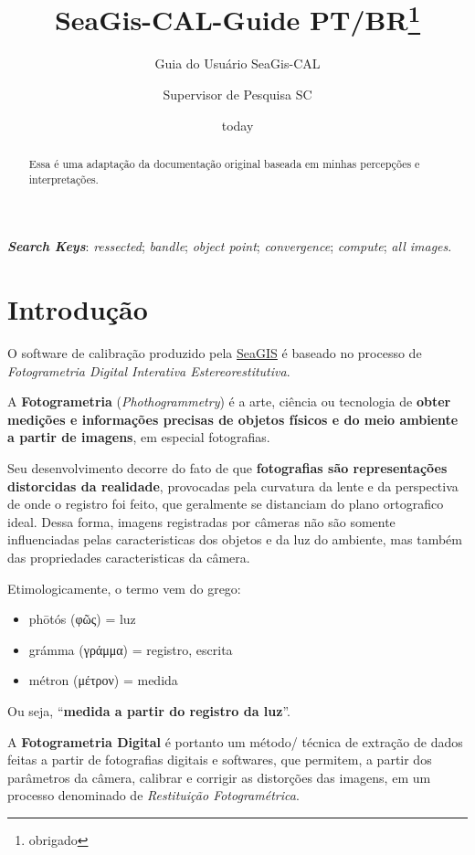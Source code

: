 \documentclass[
  12pt,
  letterpaper,
  DIV=11,
  numbers=noendperiod]{scrreprt}
\title{SeaGis-CAL-Guide PT/BR\thanks{obrigado}}
\subtitle{Guia do Usuário SeaGis-CAL}
\author{Supervisor de Pesquisa SC}
\date{today}
\renewcommand*\contentsname{Table of contents}
\newcommand\contentsname{Table of contents}
\begin{document}
\maketitle
\begin{abstract}
Essa é uma adaptação da documentação original baseada em minhas
percepções e interpretações.
\end{abstract}

\renewcommand*\contentsname{Sumário}
{
\hypersetup{linkcolor=}
\setcounter{tocdepth}{2}
\tableofcontents
}

\textbf{\emph{Search Keys}}: \emph{ressected}; \emph{bandle};
\emph{object point}; \emph{convergence}; \emph{compute}; \emph{all
images}.

\chapter{Introdução}\label{introduuxe7uxe3o}

O software de calibração produzido pela
\href{https://www.seagis.com.au/index.html\#about}{SeaGIS} é baseado no
processo de \emph{Fotogrametria Digital Interativa Estereorestitutiva}.

A \textbf{Fotogrametria} (\emph{Phothogrammetry}) é a arte, ciência ou
tecnologia de \textbf{obter medições e informações precisas de objetos
físicos e do meio ambiente a partir de imagens}, em especial
fotografias.

Seu desenvolvimento decorre do fato de que \textbf{fotografias são
representações distorcidas da realidade}, provocadas pela curvatura da
lente e da perspectiva de onde o registro foi feito, que geralmente se
distanciam do plano ortografico ideal. Dessa forma, imagens registradas
por câmeras não são somente influenciadas pelas caracteristicas dos
objetos e da luz do ambiente, mas também das propriedades
caracteristicas da câmera.

Etimologicamente, o termo vem do grego:

\begin{itemize}
\item
  phōtós (φῶς) = luz
\item
  grámma (γράμμα) = registro, escrita
\item
  métron (μέτρον) = medida
\end{itemize}

Ou seja, ``\textbf{medida a partir do registro da luz}''.

A \textbf{Fotogrametria Digital} é portanto um método/ técnica de
extração de dados feitas a partir de fotografias digitais e softwares,
que permitem, a partir dos parâmetros da câmera, calibrar e corrigir as
distorções das imagens, em um processo denominado de \emph{Restituição
Fotogramétrica}.
\end{document}
